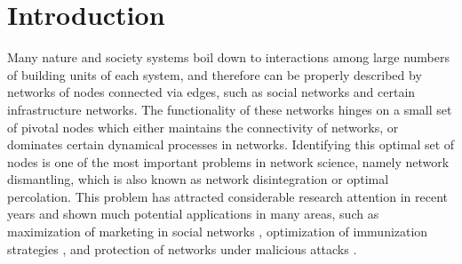\documentclass[%
 aip,
 cha,
 amsmath,amssymb,
 reprint,%
]{revtex4-1}
\begin{document}
\begin{quotation}
\end{quotation}

\section{\label{sec1}Introduction}

Many nature and society systems boil down to interactions among large numbers of building units of each system, and therefore can be properly described by networks of nodes connected via edges, such as social networks and certain infrastructure networks\cite{newman2018networks,albert2002statistical,boccaletti2006complex}. The functionality of these networks hinges on a small set of pivotal nodes which either maintains the connectivity of networks, or dominates certain dynamical processes in networks\cite{albert2000error,newman2003structure,Tian2017}. Identifying this optimal set of nodes is one of the most important problems in network science, namely network dismantling\cite{Morone2015,Braunstein12368,PhysRevE.94.012305}, which is also known as network disintegration or optimal percolation. This problem has attracted considerable research attention in recent years and shown much potential applications in many areas, such as maximization of marketing in social networks \cite{v011a004,leskovec2007dynamics,10.1145/775047.775057}, optimization of immunization strategies \cite{pastor2001epidemic,pastor2002immunization,PhysRevX.4.021024,newman2002spread,PhysRevLett.101.058701,cohen2003efficient}, and protection of networks under malicious attacks \cite{albert2000error,cohen2001breakdown,latora2005vulnerability}.

\end{document}
